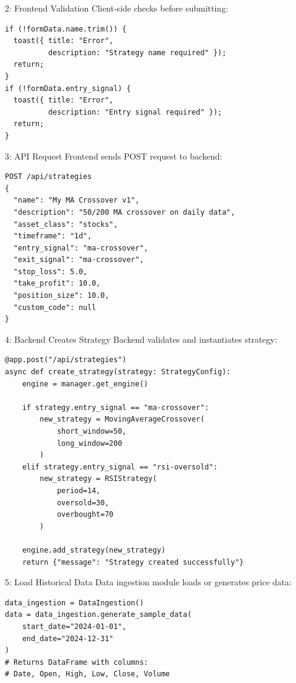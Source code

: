 \documentclass[11pt,a4paper]{article}
\begin{document}
\begin{flowstep}{2: Frontend Validation}
Client-side checks before submitting:
\begin{lstlisting}[style=pythoncode]
if (!formData.name.trim()) {
  toast({ title: "Error", 
          description: "Strategy name required" });
  return;
}
if (!formData.entry_signal) {
  toast({ title: "Error", 
          description: "Entry signal required" });
  return;
}
\end{lstlisting}
\end{flowstep}

\begin{flowstep}{3: API Request}
Frontend sends POST request to backend:
\begin{lstlisting}[style=jsoncode]
POST /api/strategies
{
  "name": "My MA Crossover v1",
  "description": "50/200 MA crossover on daily data",
  "asset_class": "stocks",
  "timeframe": "1d",
  "entry_signal": "ma-crossover",
  "exit_signal": "ma-crossover",
  "stop_loss": 5.0,
  "take_profit": 10.0,
  "position_size": 10.0,
  "custom_code": null
}
\end{lstlisting}
\end{flowstep}

\begin{flowstep}{4: Backend Creates Strategy}
Backend validates and instantiates strategy:
\begin{lstlisting}[style=pythoncode]
@app.post("/api/strategies")
async def create_strategy(strategy: StrategyConfig):
    engine = manager.get_engine()
    
    if strategy.entry_signal == "ma-crossover":
        new_strategy = MovingAverageCrossover(
            short_window=50, 
            long_window=200
        )
    elif strategy.entry_signal == "rsi-oversold":
        new_strategy = RSIStrategy(
            period=14, 
            oversold=30, 
            overbought=70
        )
    
    engine.add_strategy(new_strategy)
    return {"message": "Strategy created successfully"}
\end{lstlisting}
\end{flowstep}

\begin{flowstep}{5: Load Historical Data}
Data ingestion module loads or generates price data:
\begin{lstlisting}[style=pythoncode]
data_ingestion = DataIngestion()
data = data_ingestion.generate_sample_data(
    start_date="2024-01-01",
    end_date="2024-12-31"
)
# Returns DataFrame with columns:
# Date, Open, High, Low, Close, Volume
\end{lstlisting}
\end{flowstep}
\end{document}
